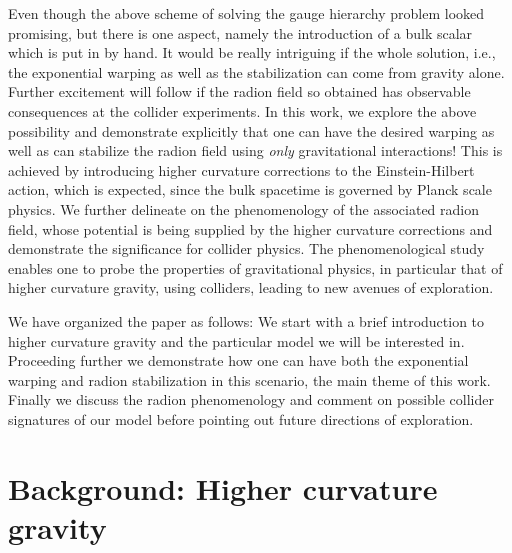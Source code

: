 \documentclass{article}
\def\EH{Einstein-Hilbert }
\begin{document}
Even though the above scheme of solving the gauge hierarchy problem looked promising, but there is one aspect, namely the introduction of a bulk scalar which is put in by hand. It would be really intriguing if the whole solution, i.e., the exponential warping as well as the stabilization can come from gravity alone. Further excitement will follow if the radion field so obtained has observable consequences at the collider experiments. In this work, we explore the above possibility and demonstrate explicitly that one can have the desired warping as well as can stabilize the radion field using \emph{only} gravitational interactions! This is achieved by introducing higher curvature corrections to the \EH action, which is expected, since the bulk spacetime is governed by Planck scale physics. We further delineate on the phenomenology of the associated radion field, whose potential is being supplied by the higher curvature corrections and demonstrate the significance for collider physics. The 
phenomenological study enables one to probe the properties of gravitational physics, in particular that of higher curvature gravity, using colliders, leading to new avenues of exploration. 

We have organized the paper as follows: We start with a brief introduction to higher curvature gravity and the particular model we will be interested in. Proceeding further we demonstrate how one can have both the exponential warping and radion stabilization in this scenario, the main theme of this work. Finally we discuss the radion phenomenology and comment on possible collider signatures of our model before pointing out future directions of exploration.
\section{Background: Higher curvature gravity}
\end{document}
